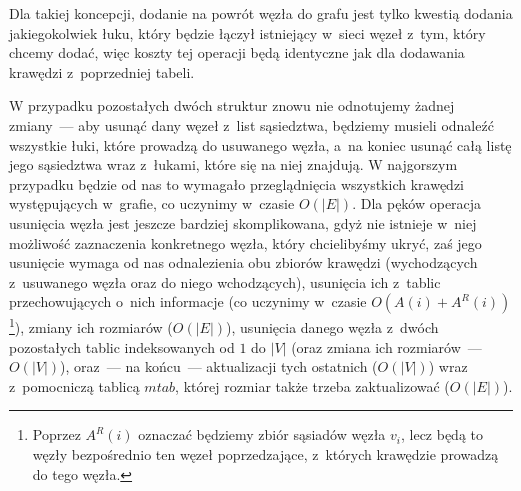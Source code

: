Dla takiej koncepcji, dodanie na powrót węzła do grafu jest tylko kwestią dodania jakiegokolwiek łuku, który będzie łączył istniejący w~sieci węzeł z~tym, który chcemy dodać, więc koszty tej operacji będą identyczne jak dla dodawania krawędzi z~poprzedniej tabeli.

W przypadku pozostałych dwóch struktur znowu nie odnotujemy żadnej zmiany~--- aby usunąć dany węzeł z~list sąsiedztwa, będziemy musieli odnaleźć wszystkie łuki, które prowadzą do usuwanego węzła, a~na koniec usunąć całą listę jego sąsiedztwa wraz z~łukami, które się na niej znajdują.
W najgorszym przypadku będzie od nas to wymagało przeglądnięcia wszystkich krawędzi występujących w~grafie, co uczynimy w~czasie $O \left( \left| E \right| \right)$.
Dla pęków operacja usunięcia węzła jest jeszcze bardziej skomplikowana, gdyż nie istnieje w~niej możliwość zaznaczenia konkretnego węzła, który chcielibyśmy ukryć, zaś jego usunięcie wymaga od nas odnalezienia obu zbiorów krawędzi (wychodzących z~usuwanego węzła oraz do niego wchodzących), usunięcia ich z~tablic przechowujących o~nich informacje (co uczynimy w~czasie $O \left( A \left( i \right) + A^{R} \left( i \right) \right)$\footnote{
	Poprzez $A^{R} \left( i \right)$ oznaczać będziemy zbiór sąsiadów węzła $v_{i}$, lecz będą to węzły bezpośrednio ten węzeł poprzedzające, z~których krawędzie prowadzą do tego węzła.
}), zmiany ich rozmiarów ($O \left( \left| E \right| \right)$), usunięcia danego węzła z~dwóch pozostałych tablic indeksowanych od $1$ do $\left| V \right|$ (oraz zmiana ich rozmiarów~--- $ O \left( \left| V \right| \right) $), oraz~--- na końcu~--- aktualizacji tych ostatnich ($O \left( \left| V \right| \right)$) wraz z~pomocniczą tablicą $mtab$, której rozmiar także trzeba zaktualizować ($O \left( \left| E \right| \right)$).

